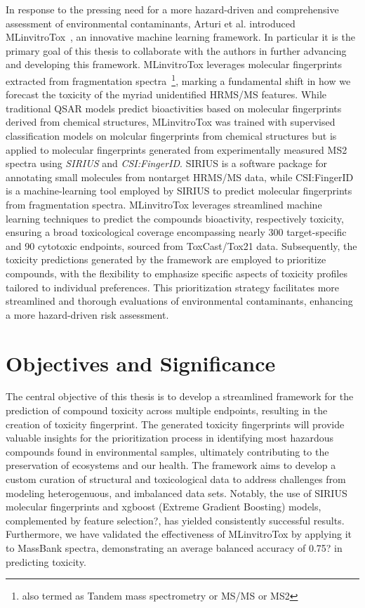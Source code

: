 In response to the pressing need for a more hazard-driven and comprehensive assessment of environmental contaminants, Arturi et al. introduced MLinvitroTox~\cite{arturi}, an innovative machine learning framework. In particular it is the primary goal of this thesis to collaborate with the authors in further advancing and developing this framework. MLinvitroTox leverages molecular fingerprints extracted from fragmentation spectra~\footnote{also termed as Tandem mass spectrometry or MS/MS or MS2}, marking a fundamental shift in how we forecast the toxicity of the myriad unidentified HRMS/MS features. While traditional QSAR models predict bioactivities based on molecular fingerprints derived from chemical structures, MLinvitroTox was trained with supervised classification models on molcular fingerprints from chemical structures but is applied to molecular fingerprints generated from experimentally measured MS2 spectra using \emph{SIRIUS} and \emph{CSI:FingerID}. SIRIUS is a software package for annotating small molecules from nontarget HRMS/MS data, while CSI:FingerID is a machine-learning tool employed by SIRIUS to predict molecular fingerprints from fragmentation spectra. MLinvitroTox leverages streamlined machine learning techniques to predict the compounds bioactivity, respectively toxicity, ensuring a broad toxicological coverage encompassing nearly 300 target-specific and 90 cytotoxic endpoints, sourced from ToxCast/Tox21 data. Subsequently, the toxicity predictions generated by the framework are employed to prioritize compounds, with the flexibility to emphasize specific aspects of toxicity profiles tailored to individual preferences. This prioritization strategy facilitates more streamlined and thorough evaluations of environmental contaminants, enhancing a more hazard-driven risk assessment.





\section{Objectives and Significance}

The central objective of this thesis is to develop a streamlined framework for the prediction of compound toxicity across multiple endpoints, resulting in the creation of toxicity fingerprint. The generated toxicity fingerprints will provide valuable insights for the prioritization process in identifying most hazardous compounds found in environmental samples, ultimately contributing to the preservation of ecosystems and our health. The framework aims to develop a custom curation of structural and toxicological data to address challenges from modeling heterogenuous, and imbalanced data sets. Notably, the use of SIRIUS molecular fingerprints and xgboost (Extreme Gradient Boosting) models, complemented by feature selection?, has yielded consistently successful results. Furthermore, we have validated the effectiveness of MLinvitroTox by applying it to MassBank spectra, demonstrating an average balanced accuracy of 0.75? in predicting toxicity.

